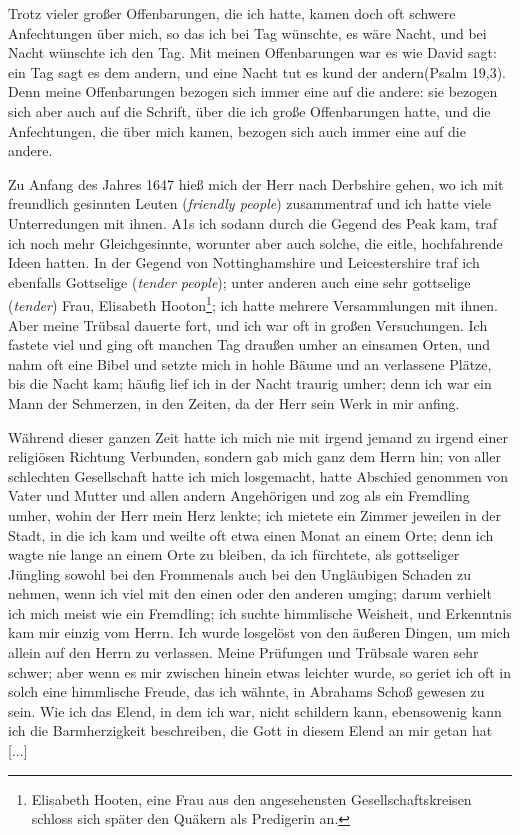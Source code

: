Trotz vieler großer Offenbarungen, die ich hatte, kamen doch
oft schwere Anfechtungen über mich, so das ich bei Tag wünschte,
es wäre Nacht, und bei Nacht wünschte ich den Tag. Mit meinen
Offenbarungen war es wie David sagt: \glqq ein Tag sagt es dem
andern, und eine Nacht tut es kund der andern\grqq (Psalm 19,3).
Denn meine Offenbarungen bezogen sich immer eine auf die
andere: sie bezogen sich aber auch auf die Schrift, über die ich
große Offenbarungen hatte, und die Anfechtungen, die über mich
kamen, bezogen sich auch immer eine auf die andere.

Zu Anfang des Jahres 1647 hieß mich der Herr nach
Derbshire gehen, wo ich mit freundlich gesinnten Leuten (\textit{friendly
people}) zusammentraf und ich hatte viele Unterredungen mit
ihnen. A1s ich sodann durch die Gegend des Peak kam, traf
ich noch mehr Gleichgesinnte, worunter aber auch solche, die eitle,
hochfahrende Ideen hatten. In der Gegend von Nottinghamshire
und Leicestershire traf ich ebenfalls Gottselige (\textit{tender people});
unter anderen auch eine sehr gottselige (\textit{tender}) Frau, Elisabeth
Hooton\footnote{Elisabeth Hooten, eine Frau aus den angesehensten 
Gesellschaftskreisen schloss sich später den Quäkern als Predigerin an.}; 
ich hatte mehrere Versammlungen mit ihnen. Aber
meine Trübsal dauerte fort, und ich war oft in großen Versuchungen. 
Ich fastete viel und ging oft manchen Tag draußen
umher an einsamen Orten, und nahm oft eine Bibel und setzte
mich in hohle Bäume und an verlassene Plätze, bis die Nacht
kam; häufig lief ich in der Nacht traurig umher; denn ich war
ein Mann der Schmerzen, in den Zeiten, da der Herr sein Werk
in mir anfing.

Während dieser ganzen Zeit hatte ich mich nie mit irgend
jemand zu irgend einer religiösen Richtung Verbunden, sondern
gab mich ganz dem Herrn hin; von aller schlechten Gesellschaft
hatte ich mich losgemacht, hatte Abschied genommen von Vater
und Mutter und allen andern Angehörigen und zog als ein
Fremdling umher, wohin der Herr mein Herz lenkte; ich mietete
ein Zimmer jeweilen in der Stadt, in die ich kam und weilte oft
etwa einen Monat an einem Orte; denn ich wagte nie lange an
einem Orte zu bleiben, da ich fürchtete, als gottseliger Jüngling
sowohl bei den \glqq Frommen\grqq als auch bei den Ungläubigen Schaden
zu nehmen, wenn ich viel mit den einen oder den anderen umging;
darum verhielt ich mich meist wie ein Fremdling; ich suchte himmlische 
Weisheit, und Erkenntnis kam mir einzig vom Herrn. Ich
wurde losgelöst von den äußeren Dingen, um mich allein auf
den Herrn zu verlassen. Meine Prüfungen und Trübsale waren
sehr schwer; aber wenn es mir zwischen hinein etwas leichter
wurde, so geriet ich oft in solch eine himmlische Freude, das ich
wähnte, in Abrahams Schoß gewesen zu sein. Wie ich das Elend,
in dem ich war, nicht schildern kann, ebensowenig kann ich die
Barmherzigkeit beschreiben, die Gott in diesem Elend an mir getan
hat [...]

